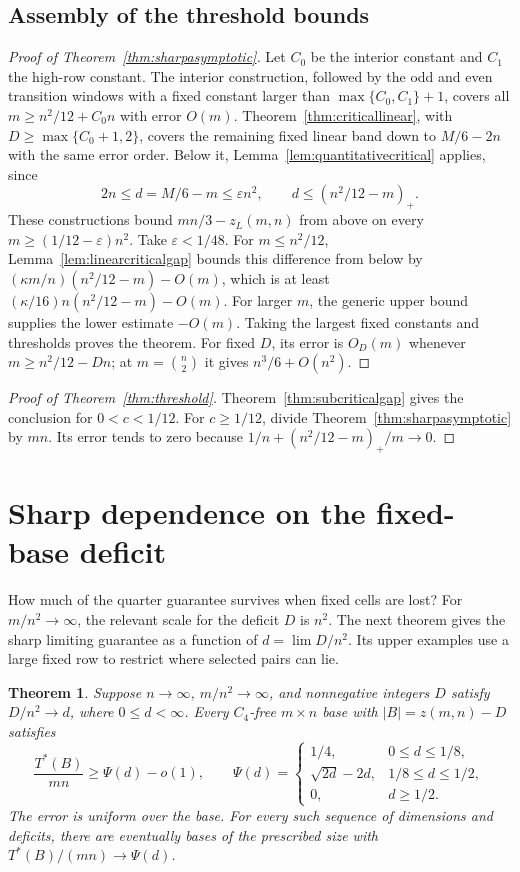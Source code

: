 \documentclass[11pt]{article}
\newtheorem{theorem}{Theorem}
\newcommand{\zl}{z_L}
\begin{document}
\subsection{Assembly of the threshold bounds}
\begin{proof}[Proof of Theorem~\ref{thm:sharpasymptotic}]
Let $C_0$ be the interior constant and $C_1$ the high-row constant.
The interior construction, followed by the odd and even transition
windows with a fixed constant larger than $\max\{C_0,C_1\}+1$, covers
all $m\ge n^2/12+C_0n$ with error $O(m)$.
Theorem~\ref{thm:criticallinear}, with $D\ge\max\{C_0+1,2\}$,
covers the remaining fixed linear band
down to $M/6-2n$ with the same error order.
Below it, Lemma~\ref{lem:quantitativecritical} applies, since
\[
 2n\le d=M/6-m\le\varepsilon n^2,
 \qquad d\le(n^2/12-m)_+.
\]
These constructions bound $mn/3-\zl(m,n)$ from above on every
$m\ge(1/12-\varepsilon)n^2$. Take $\varepsilon<1/48$.
For $m\le n^2/12$, Lemma~\ref{lem:linearcriticalgap} bounds this
difference from below by
$(\kappa m/n)(n^2/12-m)-O(m)$, which is at least
$(\kappa/16)n(n^2/12-m)-O(m)$.
For larger $m$, the generic upper bound supplies the lower estimate
$-O(m)$. Taking the largest fixed constants and thresholds proves the theorem.
For fixed $D$, its error is $O_D(m)$ whenever $m\ge n^2/12-Dn$;
at $m=\binom n2$ it gives $n^3/6+O(n^2)$.
\end{proof}

\begin{proof}[Proof of Theorem~\ref{thm:threshold}]
Theorem~\ref{thm:subcriticalgap} gives the conclusion for $0<c<1/12$.
For $c\ge1/12$, divide Theorem~\ref{thm:sharpasymptotic} by $mn$.
Its error tends to zero because
$1/n+(n^2/12-m)_+/m\to0$.
\end{proof}


\section{Sharp dependence on the fixed-base deficit}\label{sec:deficitprofile}
How much of the quarter guarantee survives when fixed cells are lost?
For $m/n^2\to\infty$, the relevant scale for the deficit $D$ is $n^2$.
The next theorem gives the sharp limiting guarantee as a function of
$d=\lim D/n^2$. Its upper examples use a large fixed row to restrict where
selected pairs can lie.

\begin{theorem}\label{thm:deficitprofile}
Suppose $n\to\infty$, $m/n^2\to\infty$, and nonnegative integers $D$
satisfy $D/n^2\to d$, where $0\le d<\infty$. Every $C_4$-free
$m\times n$ base with $|B|=z(m,n)-D$ satisfies
\[
 \frac{T^*(B)}{mn}\ge\Psi(d)-o(1),\qquad
 \Psi(d)=
 \begin{cases}
  1/4,&0\le d\le1/8,\\
  \sqrt{2d}-2d,&1/8\le d\le1/2,\\
  0,&d\ge1/2.
 \end{cases}
\]
The error is uniform over the base. For every such sequence of
dimensions and deficits, there are eventually bases of the prescribed size with
$T^*(B)/(mn)\to\Psi(d)$.
\end{theorem}
\end{document}
